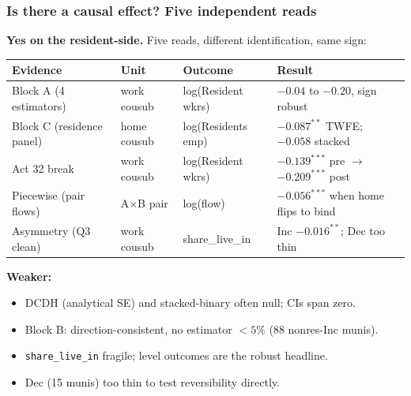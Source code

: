 \documentclass[xcolor = x11names, compress, aspectratio = 169]{beamer}
\renewcommand{\(}{\begin{columns}}
\renewcommand{\)}{\end{columns}}
\newcommand{\<}[1]{\begin{column}{#1}}
\renewcommand{\>}{\end{column}}
\begin{document}
\begin{frame}
\frametitle{Is there a causal effect? Five independent reads}
    \scriptsize
    \textbf{Yes on the resident-side.} Five reads, different identification, same sign:
    \vspace{0.05cm}
    \renewcommand{\arraystretch}{1.10}
    \setlength{\tabcolsep}{4pt}
    \begin{tabular}{p{3.0cm}p{2.2cm}p{2.4cm}p{4.0cm}}
        \toprule
        Evidence & Unit & Outcome & Result \\
        \midrule
        Block A (4 estimators)         & work cousub & log(Resident wkrs) & $-0.04$ to $-0.20$, sign robust \\
        Block C (residence panel)      & home cousub & log(Residents emp) & $-0.087^{**}$ TWFE; $-0.058$ stacked \\
        Act 32 break                   & work cousub & log(Resident wkrs) & $-0.139^{***}$ pre $\to$ $-0.209^{***}$ post \\
        Piecewise (pair flows)         & A$\times$B pair & log(flow)       & $-0.056^{***}$ when home flips to bind \\
        Asymmetry (Q3 clean)           & work cousub & share\_live\_in    & Inc $-0.016^{**}$; Dec too thin \\
        \bottomrule
    \end{tabular}
    \vspace{0.10cm}
    \textbf{Weaker:}
    \begin{itemize}\setlength{\itemsep}{0.02cm}\scriptsize
        \item DCDH (analytical SE) and stacked-binary often null; CIs span zero.
        \item Block B: direction-consistent, no estimator $<5\%$ (88 nonres-Inc munis).
        \item \texttt{share\_live\_in} fragile; level outcomes are the robust headline.
        \item Dec (15 munis) too thin to test reversibility directly.
    \end{itemize}
\end{frame}
\end{document}
